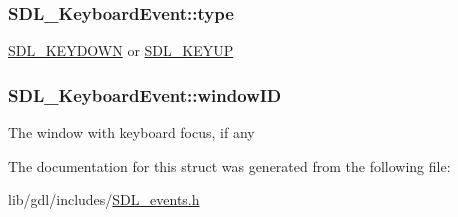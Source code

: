 \subsubsection[{type}]{ S\+D\+L\+\_\+\+Keyboard\+Event\+::type}\label{struct_s_d_l___keyboard_event_ae0b2f2aace6f80c1f47e5a14350d409a}
\hyperlink{_s_d_l__events_8h_a3b589e89be6b35c02e0dd34a55f3fccaacaf8cfd53c985cdbf6a90c811d51a1fc}{S\+D\+L\+\_\+\+K\+E\+Y\+D\+O\+W\+N} or \hyperlink{_s_d_l__events_8h_a3b589e89be6b35c02e0dd34a55f3fccaadefb8866b9d28be21c2c33c35cc66c4b}{S\+D\+L\+\_\+\+K\+E\+Y\+U\+P} \hypertarget{struct_s_d_l___keyboard_event_a56efb6780b96acd5b50d8f797efb3546}{}
\subsubsection[{window\+I\+D}]{ S\+D\+L\+\_\+\+Keyboard\+Event\+::window\+I\+D}\label{struct_s_d_l___keyboard_event_a56efb6780b96acd5b50d8f797efb3546}
The window with keyboard focus, if any 

The documentation for this struct was generated from the following file\+:\begin{DoxyCompactItemize}
\item 
lib/gdl/includes/\hyperlink{_s_d_l__events_8h}{S\+D\+L\+\_\+events.\+h}\end{DoxyCompactItemize}

